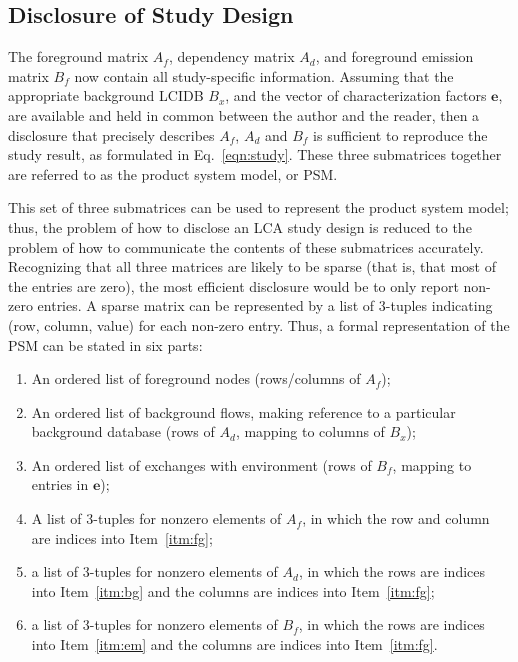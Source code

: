 \subsection{Disclosure of Study Design}

The foreground matrix $A_f$, dependency matrix $A_d$, and foreground emission matrix $B_f$ now contain all study-specific information.  Assuming that the appropriate background LCIDB $B_x$, and the vector of characterization factors $\mathbf{e}$, are available and held in common between the author and the reader, then a disclosure that precisely describes $A_f$, $A_d$ and $B_f$ is sufficient to reproduce the study result, as formulated in Eq.~\ref{eqn:study}.  These three submatrices together are referred to as the product system model, or PSM.

This set of three submatrices can be used to represent the product system model; thus, the problem of how to disclose an LCA study design is reduced to the problem of how to communicate the contents of these submatrices accurately.  Recognizing that all three matrices are likely to be sparse (that is, that most of the entries are zero), the most efficient disclosure would be to only report non-zero entries.  A sparse matrix can be represented by a list of 3-tuples indicating (row, column, value) for each non-zero entry.  Thus, a formal representation of the PSM can be stated in six parts:
\begin{enumerate}[label=\alph*.]
\item\label{itm:fg} An ordered list of foreground nodes (rows/columns of $A_f$);
\item\label{itm:bg} An ordered list of background flows, making reference to a particular background database (rows of $A_d$, mapping to columns of $B_x$);
\item\label{itm:em} An ordered list of exchanges with environment (rows of $B_f$, mapping to entries in $\mathbf{e}$);
\item A list of 3-tuples for nonzero elements of $A_f$, in which the row and column are indices into Item~\ref{itm:fg};
\item a list of 3-tuples for nonzero elements of $A_d$, in which the rows are indices into Item~\ref{itm:bg} and the columns are indices into Item~\ref{itm:fg};
\item a list of 3-tuples for nonzero elements of $B_f$, in which the rows are indices into Item~\ref{itm:em} and the columns are indices into Item~\ref{itm:fg}.
\end{enumerate}

